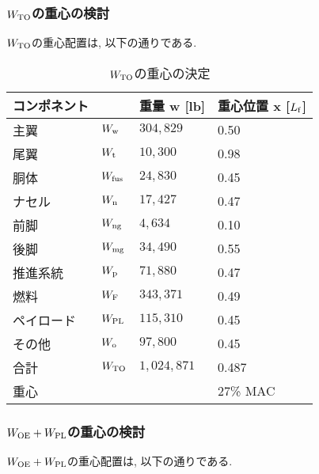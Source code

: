 \documentclass[12pt]{jsarticle}
\begin{document}
\subsubsection{$W_{\rm TO}$の重心の検討}
$W_{\rm TO}$の重心配置は, 以下の通りである.
\begin{table}[H]
	\caption{$W_{\rm TO}$の重心の決定}
	\begin{center}
		\begin{tabular}{p{2cm} p{2cm} p{3cm} p{3cm}} \hline
			コンポネント  & & 重量 w [lb] & 重心位置 x [$L_{\rm f}$] \\ \hline \hline
			主翼 & $W_{\rm w}$ & $304,829$ & 0.50 \\
			尾翼 & $W_{\rm t}$ & $10,300$ & 0.98 \\
			胴体 & $W_{\rm fus}$ & $24,830$ & 0.45 \\
			ナセル & $W_{\rm n}$ & $17,427$ & 0.47 \\
			前脚 & $W_{\rm ng}$ & $4,634$ & 0.10 \\
			後脚 & $W_{\rm mg}$ & $34,490$ & 0.55 \\
			推進系統 & $W_{\rm p}$ & $71,880$ & 0.47 \\
			燃料 & $W_{\rm F}$ & $343,371$ & 0.49 \\
			ペイロード & $W_{\rm PL}$ & $115,310$ & 0.45 \\
			その他 & $W_{\rm o}$ & $97,800$ & 0.45 \\ \hline
			合計 & $W_{\rm TO}$ & $1,024,871$ & 0.487 \\ \hline \hline
			重心 & & & 27\% MAC \\ \hline
		\end{tabular}
	\end{center}
\end{table}

\subsubsection{$W_{\rm OE} + W_{\rm PL}$の重心の検討}
$W_{\rm OE} + W_{\rm PL}$の重心配置は, 以下の通りである.
\end{document}
